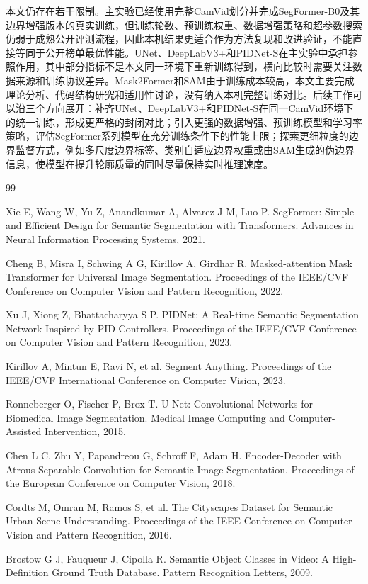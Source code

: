 \documentclass{report}
\begin{document}
本文仍存在若干限制。主实验已经使用完整CamVid划分并完成SegFormer-B0及其边界增强版本的真实训练，但训练轮数、预训练权重、数据增强策略和超参数搜索仍弱于成熟公开评测流程，因此本机结果更适合作为方法复现和改进验证，不能直接等同于公开榜单最优性能。UNet、DeepLabV3+和PIDNet-S在主实验中承担参照作用，其中部分指标不是本文同一环境下重新训练得到，横向比较时需要关注数据来源和训练协议差异。Mask2Former和SAM由于训练成本较高，本文主要完成理论分析、代码结构研究和适用性讨论，没有纳入本机完整训练对比。后续工作可以沿三个方向展开：补齐UNet、DeepLabV3+和PIDNet-S在同一CamVid环境下的统一训练，形成更严格的封闭对比；引入更强的数据增强、预训练模型和学习率策略，评估SegFormer系列模型在充分训练条件下的性能上限；探索更细粒度的边界监督方式，例如多尺度边界标签、类别自适应边界权重或由SAM生成的伪边界信息，使模型在提升轮廓质量的同时尽量保持实时推理速度。

\begin{thebibliography}{99}

Xie E, Wang W, Yu Z, Anandkumar A, Alvarez J M, Luo P.
SegFormer: Simple and Efficient Design for Semantic Segmentation with Transformers.
Advances in Neural Information Processing Systems, 2021.

Cheng B, Misra I, Schwing A G, Kirillov A, Girdhar R.
Masked-attention Mask Transformer for Universal Image Segmentation.
Proceedings of the IEEE/CVF Conference on Computer Vision and Pattern Recognition, 2022.

Xu J, Xiong Z, Bhattacharyya S P.
PIDNet: A Real-time Semantic Segmentation Network Inspired by PID Controllers.
Proceedings of the IEEE/CVF Conference on Computer Vision and Pattern Recognition, 2023.

Kirillov A, Mintun E, Ravi N, et al.
Segment Anything.
Proceedings of the IEEE/CVF International Conference on Computer Vision, 2023.

Ronneberger O, Fischer P, Brox T.
U-Net: Convolutional Networks for Biomedical Image Segmentation.
Medical Image Computing and Computer-Assisted Intervention, 2015.

Chen L C, Zhu Y, Papandreou G, Schroff F, Adam H.
Encoder-Decoder with Atrous Separable Convolution for Semantic Image Segmentation.
Proceedings of the European Conference on Computer Vision, 2018.

Cordts M, Omran M, Ramos S, et al.
The Cityscapes Dataset for Semantic Urban Scene Understanding.
Proceedings of the IEEE Conference on Computer Vision and Pattern Recognition, 2016.

Brostow G J, Fauqueur J, Cipolla R.
Semantic Object Classes in Video: A High-Definition Ground Truth Database.
Pattern Recognition Letters, 2009.

\end{thebibliography}
\end{document}
